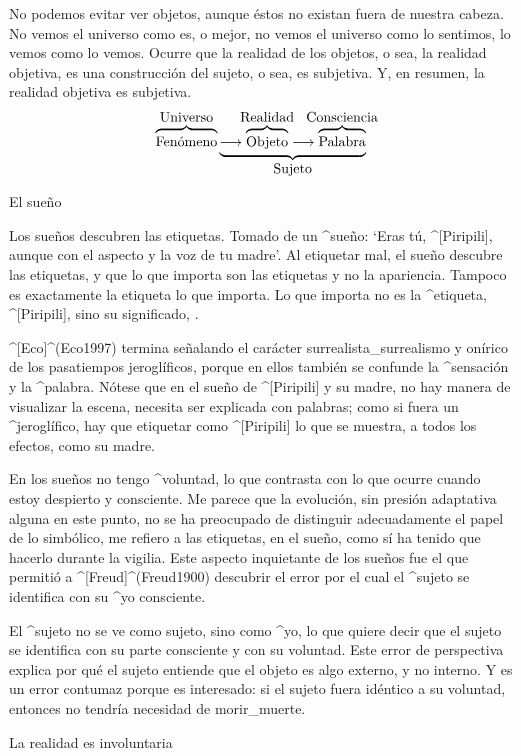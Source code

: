 No podemos evitar ver objetos, aunque éstos no existan fuera de nuestra
cabeza. No vemos el universo como es, o mejor, no vemos el universo como
lo sentimos, lo vemos como lo vemos. Ocurre que la realidad de los
objetos, o sea, la realidad objetiva, es una construcción del sujeto, o
sea, es subjetiva. Y, en resumen, la realidad objetiva es subjetiva.
$$\overbrace{\hbox{\strut Fenómeno}}^{\hbox{Universo}}
 \underbrace{\longrightarrow
  \overbrace{\hbox{\strut Objeto}}^{\hbox to0pt{\hss Realidad\hss}}
  \longrightarrow
  \overbrace{\hbox{\strut Palabra}}^{\hbox to 0pt{\hss
   Consciencia\hss}}}_{\hbox{Sujeto}}$$


\Section El sueño

Los sueños descubren las etiquetas. Tomado de un ^{sueño}: `Eras tú,
^[Piripili], aunque con el aspecto y la voz de tu madre'. Al etiquetar
mal, el sueño descubre las etiquetas, y que lo que importa son las
etiquetas y no la apariencia. Tampoco es exactamente la etiqueta lo que
importa. Lo que importa no es la ^{etiqueta}, ^[Piripili], sino su
significado, .

^[Eco]^(Eco1997) termina señalando el carácter surrealista_{surrealismo}
y onírico de los pasatiempos jeroglíficos, porque en ellos también se
confunde la ^{sensación} y la ^{palabra}. Nótese que en el sueño de
^[Piripili] y su madre, no hay manera de visualizar la escena, necesita
ser explicada con palabras; como si fuera un ^{jeroglífico}, hay que
etiquetar como ^[Piripili] lo que se muestra, a todos los efectos, como
su madre.

En los sueños no tengo ^{voluntad}, lo que contrasta con lo que ocurre
cuando estoy despierto y consciente. Me parece que la evolución, sin
presión adaptativa alguna en este punto, no se ha preocupado de
distinguir adecuadamente el papel de lo simbólico, me refiero a las
etiquetas, en el sueño, como sí ha tenido que hacerlo durante la
vigilia. Este aspecto inquietante de los sueños fue el que permitió a
^[Freud]^(Freud1900) descubrir el error por el cual el ^{sujeto} se
identifica con su ^{yo} consciente.

El ^{sujeto} no se ve como sujeto, sino como ^{yo}, lo que quiere decir
que el sujeto se identifica con su parte consciente y con su voluntad.
Este error de perspectiva explica por qué el sujeto entiende que el
objeto es algo externo, y no interno. Y es un error contumaz porque es
interesado: si el sujeto fuera idéntico a su voluntad, entonces no
tendría necesidad de morir_{muerte}.


\Section La realidad es involuntaria

